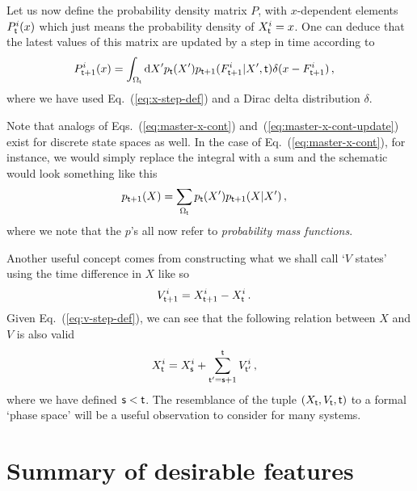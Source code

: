 \documentclass{book}
\begin{document}
Let us now define the probability density matrix $P$, with $x$-dependent elements $P^i_{\sf t}(x)$ which just means the probability density of $X^i_{\sf t}=x$. One can deduce that the latest values of this matrix are updated by a step in time according to
\begin{align}
P^i_{{\sf t}+1}(x) &= \int_{\Omega_{\sf t}}{\rm d}X' p_{\sf t}(X') p_{{\sf t}+1}(F^i_{{\sf t}+1}|X',{\sf t}) \delta (x-F^i_{{\sf t}+1}) \label{eq:master-x-cont-update}\,,
\end{align}
where we have used Eq.~(\ref{eq:x-step-def}) and a Dirac delta distribution $\delta$.

Note that analogs of Eqs.~(\ref{eq:master-x-cont}) and~(\ref{eq:master-x-cont-update}) exist for discrete state spaces as well. In the case of Eq.~(\ref{eq:master-x-cont}), for instance, we would simply replace the integral with a sum and the schematic would look something like this
\begin{align}
p_{{\sf t}+1}(X) &= \sum_{\Omega_{\sf t}} p_{\sf t}(X') p_{{\sf t}+1}(X \vert X') \label{eq:master-x-disc} \,,
\end{align}
where we note that the $p$'s all now refer to \emph{probability mass functions}.

Another useful concept comes from constructing what we shall call `$V$ states' using the time difference in $X$ like so
\begin{align}
V^{i}_{{\sf t}+1} &= X^{i}_{{\sf t}+1} - X^{i}_{\sf t} \label{eq:v-step-def}\,.
\end{align}
Given Eq.~(\ref{eq:v-step-def}), we can see that the following relation between $X$ and $V$ is also valid
\begin{align}
X^{i}_{\sf t} &= X_{\sf s}^{i} + \sum_{{\sf t}'={\sf s}+1}^{\sf t}V_{{\sf t}'}^{i} \label{eq:x-implicit-solution} \,,
\end{align}
where we have defined ${\sf s}<{\sf t}$. The resemblance of the tuple $(X_{\sf t}, V_{\sf t}, {\sf t})$ to a formal `phase space' will be a useful observation to consider for many systems.


\section{\sffamily Summary of desirable features}
\end{document}
